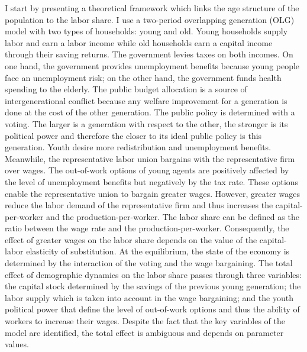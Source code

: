I start by presenting a theoretical framework which links the age structure of the population to the labor share. I use a two-period overlapping generation (OLG) model with two types of households: young and old. Young households supply labor and earn a labor income while old households earn a capital income through their saving returns.
The government levies taxes on both incomes. On one hand, the government provides unemployment benefits because young people face an unemployment risk; on the other hand, the government funds health spending to the elderly. The public budget allocation is a source of intergenerational conflict because any welfare improvement for a generation is done at the cost of the other generation. The public policy is determined with a voting. The larger is a generation with respect to the other, the stronger is its political power and therefore the closer to its ideal public policy is this generation. Youth desire more redistribution and unemployment benefits.
Meanwhile, the representative labor union bargains with the representative firm over wages. The out-of-work options of young agents are positively affected by the level of unemployment benefits but negatively by the tax rate. These options enable the representative union to bargain greater wages. However, greater wages reduce the labor demand of the representative firm and thus increases the capital-per-worker and the production-per-worker. The labor share can be defined as the ratio between the wage rate and the production-per-worker. Consequently, the effect of greater wages on the labor share depends on the value of the capital-labor elasticity of substitution.
At the equilibrium, the state of the economy is determined by the interaction of the voting and the wage bargaining. The total effect of demographic dynamics on the labor share passes through three variables: the capital stock determined by the savings of the previous young generation; the labor supply which is taken into account in the wage bargaining; and the youth political power that define the level of out-of-work options and thus the ability of workers to increase their wages. Despite the fact that the key variables of the model are identified, the total effect is ambiguous and depends on parameter values.

